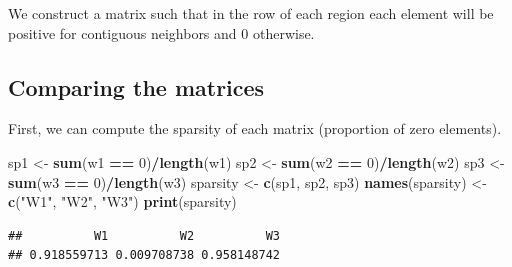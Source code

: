 \documentclass[
  a4paper,
]{article}
\newenvironment{Shaded}{\begin{snugshade}}{\end{snugshade}}
\newcommand{\AttributeTok}[1]{\textcolor[rgb]{0.13,0.29,0.53}{#1}}
\newcommand{\CommentTok}[1]{\textcolor[rgb]{0.56,0.35,0.01}{\textit{#1}}}
\newcommand{\ConstantTok}[1]{\textcolor[rgb]{0.56,0.35,0.01}{#1}}
\newcommand{\DecValTok}[1]{\textcolor[rgb]{0.00,0.00,0.81}{#1}}
\newcommand{\FunctionTok}[1]{\textcolor[rgb]{0.13,0.29,0.53}{\textbf{#1}}}
\newcommand{\NormalTok}[1]{#1}
\newcommand{\OtherTok}[1]{\textcolor[rgb]{0.56,0.35,0.01}{#1}}
\newcommand{\SpecialCharTok}[1]{\textcolor[rgb]{0.81,0.36,0.00}{\textbf{#1}}}
\newcommand{\StringTok}[1]{\textcolor[rgb]{0.31,0.60,0.02}{#1}}
\begin{document}
We construct a matrix such that in the row of each region each element
will be positive for contiguous neighbors and 0 otherwise.

\begin{Shaded}
\end{Shaded}

\subsection{Comparing the matrices}\label{comparing-the-matrices}

First, we can compute the sparsity of each matrix (proportion of zero
elements).

\begin{Shaded}
\begin{Highlighting}[]
\NormalTok{sp1 }\OtherTok{\textless{}{-}} \FunctionTok{sum}\NormalTok{(w1 }\SpecialCharTok{==} \DecValTok{0}\NormalTok{)}\SpecialCharTok{/}\FunctionTok{length}\NormalTok{(w1)}
\NormalTok{sp2 }\OtherTok{\textless{}{-}} \FunctionTok{sum}\NormalTok{(w2 }\SpecialCharTok{==} \DecValTok{0}\NormalTok{)}\SpecialCharTok{/}\FunctionTok{length}\NormalTok{(w2)}
\NormalTok{sp3 }\OtherTok{\textless{}{-}} \FunctionTok{sum}\NormalTok{(w3 }\SpecialCharTok{==} \DecValTok{0}\NormalTok{)}\SpecialCharTok{/}\FunctionTok{length}\NormalTok{(w3)}
\NormalTok{sparsity }\OtherTok{\textless{}{-}} \FunctionTok{c}\NormalTok{(sp1, sp2, sp3)}
\FunctionTok{names}\NormalTok{(sparsity) }\OtherTok{\textless{}{-}} \FunctionTok{c}\NormalTok{(}\StringTok{"W1"}\NormalTok{, }\StringTok{"W2"}\NormalTok{, }\StringTok{"W3"}\NormalTok{)}
\FunctionTok{print}\NormalTok{(sparsity)}
\end{Highlighting}
\end{Shaded}

\begin{verbatim}
##          W1          W2          W3 
## 0.918559713 0.009708738 0.958148742
\end{verbatim}
\end{document}

